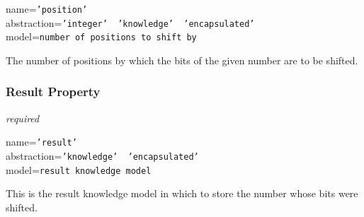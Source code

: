 name=\texttt{'position'}\\
abstraction=\texttt{'integer' \vline\ 'knowledge' \vline\ 'encapsulated'}\\
model=\texttt{number of positions to shift by}

The number of positions by which the bits of the given number are to be shifted.

\subsubsection{Result Property}

\emph{required}

name=\texttt{'result'}\\
abstraction=\texttt{'knowledge' \vline\ 'encapsulated'}\\
model=\texttt{result knowledge model}

This is the result knowledge model in which to store the number whose bits were
shifted.
